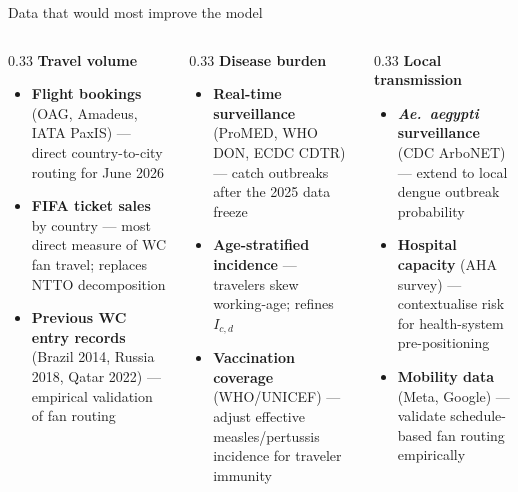 \documentclass[aspectratio=169, 11pt]{beamer}
\begin{document}
\begin{frame}{Data that would most improve the model}
  \begin{columns}[T]
    \begin{column}{0.33\textwidth}
      \textbf{Travel volume}
      \begin{itemize}\small
        \item \textbf{Flight bookings} (OAG, Amadeus, IATA PaxIS) —
              direct country-to-city routing for June 2026
        \item \textbf{FIFA ticket sales} by country — most direct
              measure of WC fan travel; replaces NTTO
              decomposition
        \item \textbf{Previous WC entry records} (Brazil 2014,
              Russia 2018, Qatar 2022) — empirical validation
              of fan routing
      \end{itemize}
    \end{column}
    \begin{column}{0.33\textwidth}
      \textbf{Disease burden}
      \begin{itemize}\small
        \item \textbf{Real-time surveillance} (ProMED, WHO DON,
              ECDC CDTR) — catch outbreaks after the 2025
              data freeze
        \item \textbf{Age-stratified incidence} — travelers skew
              working-age; refines $I_{c,d}$
        \item \textbf{Vaccination coverage} (WHO/UNICEF) — adjust
              effective measles/pertussis incidence for
              traveler immunity
      \end{itemize}
    \end{column}
    \begin{column}{0.33\textwidth}
      \textbf{Local transmission}
      \begin{itemize}\small
        \item \textbf{\textit{Ae.~aegypti} surveillance} (CDC
              ArboNET) — extend to local dengue outbreak
              probability
        \item \textbf{Hospital capacity} (AHA survey) —
              contextualise risk for health-system
              pre-positioning
        \item \textbf{Mobility data} (Meta, Google) —
              validate schedule-based fan routing
              empirically
      \end{itemize}
    \end{column}
  \end{columns}
\end{frame}
\end{document}
